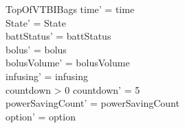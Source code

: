 \begin{schema}{TopOfVTBIBags}
	time' = time\\ State' = State\\
	battStatus' = battStatus\\
	bolus' = bolus\\
	bolusVolume' = bolusVolume\\
	infusing' = infusing\\
	countdown > 0 \land countdown' = 5\\
	powerSavingCount' = powerSavingCount\\ option' = option\\
\end{schema}

